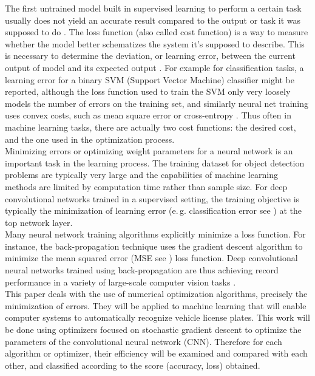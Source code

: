 \documentclass[lnbip]{svmultln}
\newcommand{\eg}{e.\,g. }
\begin{document}
	The first untrained model built in supervised learning to perform a certain task usually does not yield an accurate result compared to the output or task it was supposed to do \cite[]{goodfellow2016deep, geron2017hands}.
	The loss function (also called cost function) is a way to measure whether the model better schematizes the system it's supposed to describe. This is necessary to determine the deviation, or learning error, %
	between the current output of model and its expected output \cite[]{antoine2018apprentissage}. 
	For example for classification tasks, a learning error %
	for a binary SVM (Support Vector Machine) classifier might be reported, although the loss function used to train the SVM only very loosely models the number of errors on the training set, and similarly neural net training uses convex costs, such as mean square error or cross-entropy \cite[]{burges2006learning}.  
	Thus often in machine learning tasks, there are actually two cost functions: the desired cost, and the one used in the optimization process. \\
	
	Minimizing errors or optimizing weight parameters for a neural network is an important task in the learning process. The training dataset for object detection problems are typically very large and the capabilities of machine learning methods are limited by computation time rather than sample size. %
	For deep convolutional networks trained in a supervised setting, the training objective is typically the minimization of learning error (\eg classification error see \cite[chap. 3]{ml2008python}) at the top network layer. \\Many neural network training algorithms explicitly minimize a loss function. For instance, the back-propagation technique uses the gradient descent algorithm to minimize the mean squared error (MSE see \cite[]{bosman2020visualising}) loss function. 
	Deep convolutional neural networks trained using back-propagation are thus achieving record performance in a variety of large-scale computer vision tasks \cite[]{krizhevsky2012imagenet, simonyan2014very, huang2017densely}.\\
	
	This paper deals with the use of numerical optimization algorithms, precisely the minimization of errors. They will be applied to machine learning that will enable computer systems to automatically recognize vehicle license plates. This work will be done using optimizers focused on stochastic gradient descent to optimize the parameters of the convolutional neural network (CNN).
	Therefore for each algorithm or optimizer, their efficiency will be examined and compared with each other, and classified according to the score (accuracy, loss) obtained.\\
	
\end{document}
